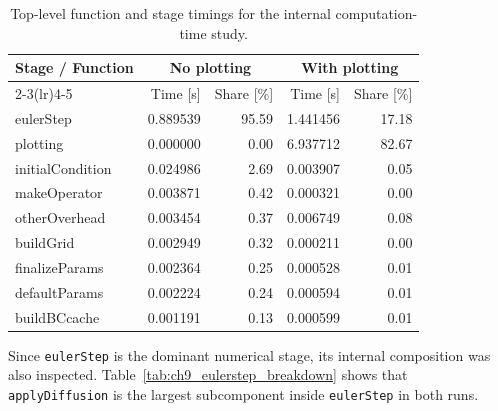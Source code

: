 \begin{table}[htbp]
    \centering
    \caption{Top-level function and stage timings for the internal computation-time study.}
    \label{tab:ch9_function_timing}
    \begin{tabular}{lrrrr}
        \toprule
        \multirow{2}{*}{Stage / Function} & \multicolumn{2}{c}{No plotting} & \multicolumn{2}{c}{With plotting} \\
        \cmidrule(lr){2-3}\cmidrule(lr){4-5}
         & Time [s] & Share [\%] & Time [s] & Share [\%] \\
        \midrule
        eulerStep        & 0.889539 & 95.59 & 1.441456 & 17.18 \\
        plotting         & 0.000000 & 0.00  & 6.937712 & 82.67 \\
        initialCondition & 0.024986 & 2.69  & 0.003907 & 0.05 \\
        makeOperator     & 0.003871 & 0.42  & 0.000321 & 0.00 \\
        otherOverhead    & 0.003454 & 0.37  & 0.006749 & 0.08 \\
        buildGrid        & 0.002949 & 0.32  & 0.000211 & 0.00 \\
        finalizeParams   & 0.002364 & 0.25  & 0.000528 & 0.01 \\
        defaultParams    & 0.002224 & 0.24  & 0.000594 & 0.01 \\
        buildBCcache     & 0.001191 & 0.13  & 0.000599 & 0.01 \\
        \bottomrule
    \end{tabular}
\end{table}

Since \texttt{eulerStep} is the dominant numerical stage, its internal composition was also inspected. Table~\ref{tab:ch9_eulerstep_breakdown} shows that \texttt{applyDiffusion} is the largest subcomponent inside \texttt{eulerStep} in both runs.

